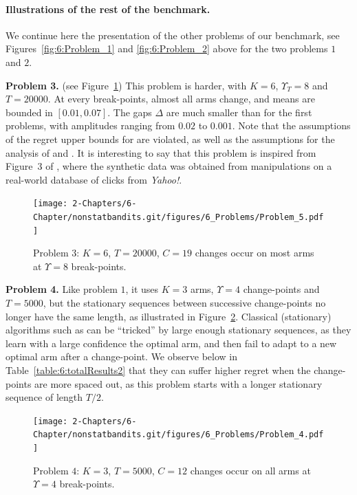 \paragraph{Illustrations of the rest of the benchmark.}\label{par:6:benchmark2}

We continue here the presentation of the other problems of our benchmark, see Figures~\ref{fig:6:Problem_1} and \ref{fig:6:Problem_2} above for the two problems $1$ and $2$.

\textbf{Problem 3.} (see Figure~\ref{fig:6:Problem_5}) This problem is harder, with $K=6$, $\Upsilon_T=8$ and $T=20000$.
At every break-points, almost all arms change,
and means are bounded in $[0.01, 0.07]$.
The gaps $\Delta$ are much smaller than for the first problems, with amplitudes ranging from $0.02$ to $0.001$.
Note that the assumptions of the regret upper bounds for \GLRklUCB{} are violated, as well as the assumptions for the analysis of \MUCB{} and \CUSUMUCB.
It is interesting to say that this problem is inspired from Figure~3 of \cite{CaoZhenKvetonXie18}, where the synthetic data was obtained from manipulations on a real-world database of clicks from \emph{Yahoo!}.

\begin{figure}[h!]  %
    \centering
    \texttt{[image: 2-Chapters/6-Chapter/nonstatbandits.git/figures/6\_Problems/Problem\_5.pdf]}
    \caption{Problem $3$: $K=6$, $T=20000$, $C=19$ changes occur on most arms at $\Upsilon=8$ break-points.}
    \label{fig:6:Problem_5}
\end{figure}


\textbf{Problem 4.}
%
Like problem $1$, it uses $K=3$ arms, $\Upsilon=4$ change-points and $T=5000$,
but the stationary sequences between successive change-points no longer have the same length, as illustrated in Figure~\ref{fig:6:Problem_4}.
Classical (stationary) algorithms such as \klUCB{} can be ``tricked'' by large enough stationary sequences, as they learn with a large confidence the optimal arm, and then fail to adapt to a new optimal arm after a change-point.
We observe below in Table~\ref{table:6:totalResults2} that they can suffer higher regret when the change-points are more spaced out, as this problem starts with a longer stationary sequence of length $T/2$.

\begin{figure}[h!]  %
    \centering
    \texttt{[image: 2-Chapters/6-Chapter/nonstatbandits.git/figures/6\_Problems/Problem\_4.pdf]}
    \caption{Problem $4$: $K=3$, $T=5000$, $C=12$ changes occur on all arms at $\Upsilon=4$ break-points.}
    \label{fig:6:Problem_4}
\end{figure}


